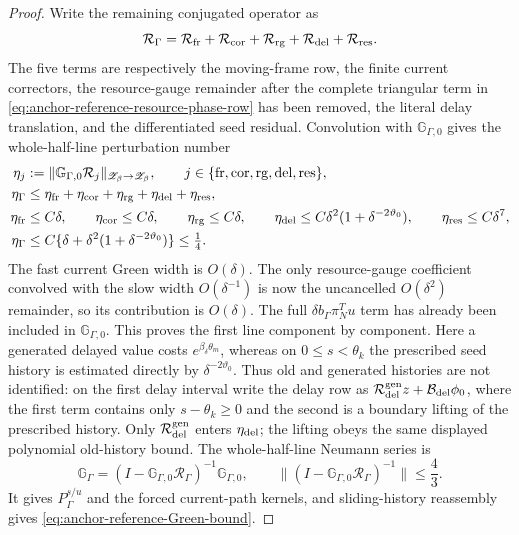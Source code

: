 \begin{proof}
Write the remaining conjugated operator as
\[
 \mathcal R_\Gamma
 =\mathcal R_{\rm fr}+\mathcal R_{\rm cor}
  +\mathcal R_{\rm rg}+\mathcal R_{\rm del}
  +\mathcal R_{\rm res}.
\]
The five terms are respectively the moving-frame row, the finite current
correctors, the resource-gauge remainder after the complete triangular
term in \cref{eq:anchor-reference-resource-phase-row} has been removed,
the literal delay translation, and the differentiated seed residual.
Convolution with \(\mathbb G_{\Gamma,0}\) gives the whole-half-line
perturbation number
\begin{equation}
 \begin{split}
 \eta_j&:=\|\mathbb G_{\Gamma,0}\mathcal R_j\|_
       {\mathscr Z_\beta\to\mathscr Z_\beta},
       \qquad j\in\{{\rm fr,cor,rg,del,res}\},\\
 \eta_\Gamma
 &\le\eta_{\rm fr}+\eta_{\rm cor}+\eta_{\rm rg}
       +\eta_{\rm del}+\eta_{\rm res},\\
 \eta_{\rm fr}&\le C\delta,\qquad
 \eta_{\rm cor}\le C\delta,\qquad
 \eta_{\rm rg}\le C\delta,\qquad
 \eta_{\rm del}\le
 C\delta^2(1+\delta^{-2\vartheta_0}),\qquad
 \eta_{\rm res}\le C\delta^7,\\
 \eta_\Gamma
 &\le C\{\delta+\delta^2(1+\delta^{-2\vartheta_0})\}
 \le\tfrac14.                                        \label{eq:anchor-reference-dichotomy-number}
 \end{split}
\end{equation}
The fast current Green width is \(O(\delta)\).  The only resource-gauge
coefficient convolved with the slow width \(O(\delta^{-1})\) is now the
uncancelled \(O(\delta^2)\) remainder, so its contribution is
\(O(\delta)\).  The full \(\delta b_\Gamma\pi_N^Tu\) term has already been
included in \(\mathbb G_{\Gamma,0}\).  This proves the first line
component by component.
Here a generated delayed value costs
\(e^{\beta_\delta\theta_m}\), whereas on
\(0\le s<\theta_k\) the prescribed seed history is estimated directly by
\(\delta^{-2\vartheta_0}\).  Thus old and generated histories are not
identified: on the first delay interval write the delay row as
\(\mathcal R_{\rm del}^{\rm gen}z+\mathcal B_{\rm del}\phi_0\), where the
first term contains only \(s-\theta_k\ge0\) and the second is a boundary
lifting of the prescribed history.  Only
\(\mathcal R_{\rm del}^{\rm gen}\) enters \(\eta_{\rm del}\); the lifting
obeys the same displayed polynomial old-history bound.  The whole-half-line
Neumann series is
\begin{equation}
 \mathbb G_\Gamma
 =(I-\mathbb G_{\Gamma,0}\mathcal R_\Gamma)^{-1}
       \mathbb G_{\Gamma,0},\qquad
 \|(I-\mathbb G_{\Gamma,0}\mathcal R_\Gamma)^{-1}\|
 \le\frac43 .                                        \label{eq:anchor-reference-Green-Neumann}
\end{equation}
It gives \(P_\Gamma^{s/u}\) and the forced current-path kernels, and
sliding-history reassembly gives
\cref{eq:anchor-reference-Green-bound}.


\end{proof}
